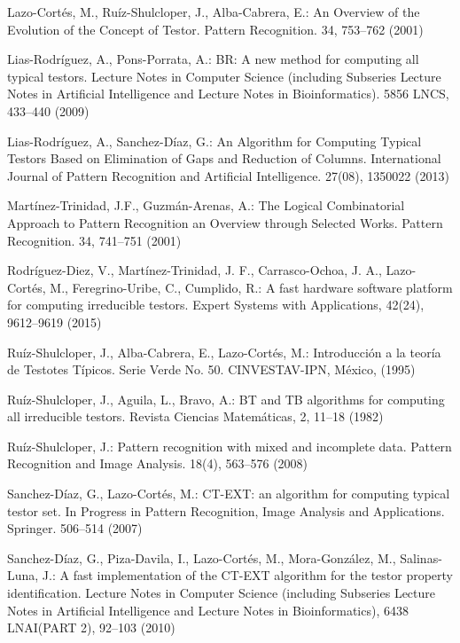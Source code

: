 \documentclass[citeauthoryear]{llncs}
\begin{document}
\begin{thebibliography}{}
	Lazo-Cort\'es, M., Ruíz-Shulcloper, J., Alba-Cabrera, E.:
	An Overview of the Evolution of the Concept of Testor. 
	Pattern Recognition. 34, 753--762 (2001)

	Lias-Rodr\'iguez, A., Pons-Porrata, A.:
	BR: A new method for computing all typical testors. 
	Lecture Notes in Computer Science (including Subseries Lecture Notes 
	in Artificial Intelligence and Lecture Notes in Bioinformatics).
	5856 LNCS, 433--440 (2009)

	Lias-Rodr\'iguez, A., Sanchez-D\'iaz, G.:
 	An Algorithm for Computing Typical Testors Based on Elimination of Gaps and Reduction of Columns.
 	International Journal of Pattern Recognition and Artificial Intelligence. 27(08), 1350022 (2013)

	Mart\'inez-Trinidad, J.F., Guzm\'an-Arenas, A.: 
	The Logical Combinatorial Approach to Pattern Recognition an Overview through Selected Works. 
	Pattern Recognition. 34, 741--751 (2001)

	Rodríguez-Diez, V., Martínez-Trinidad, J. F., Carrasco-Ochoa, J. A., Lazo-Cortés, M., Feregrino-Uribe, C., Cumplido, R.:
	A fast hardware software platform for computing irreducible testors. 
	Expert Systems with Applications, 
	42(24), 9612–9619 (2015)

	Ruíz-Shulcloper, J., Alba-Cabrera, E., Lazo-Cort\'es, M.:
	Introducci\'{o}n a la teor\'ia de Testotes T\'ipicos. 
	Serie Verde No. 50. CINVESTAV-IPN, México, (1995)
	
	Ruíz-Shulcloper, J., Aguila, L., Bravo, A.:
	BT and TB algorithms for computing all irreducible testors. 
	Revista Ciencias Matem\'{a}ticas, 2, 11--18 (1982)

	Ruíz-Shulcloper, J.:
	Pattern recognition with mixed and incomplete data. 
	Pattern Recognition and Image Analysis. 18(4), 563--576 (2008)
	
	Sanchez-D\'iaz, G., Lazo-Cort\'es, M.:
	CT-EXT: an algorithm for computing typical testor set. 
	In Progress in Pattern Recognition, Image Analysis and Applications. Springer. 506--514 (2007)

	Sanchez-D\'iaz, G., Piza-Davila, I., Lazo-Cort\'es, M., Mora-Gonz\'alez, M., Salinas-Luna, J.:
	A fast implementation of the CT-EXT algorithm for the testor property identification. 
	Lecture Notes in Computer Science (including Subseries Lecture Notes in Artificial Intelligence and 
	Lecture	Notes in Bioinformatics), 6438 LNAI(PART 2), 92--103 (2010)


\end{thebibliography}
\end{document}
